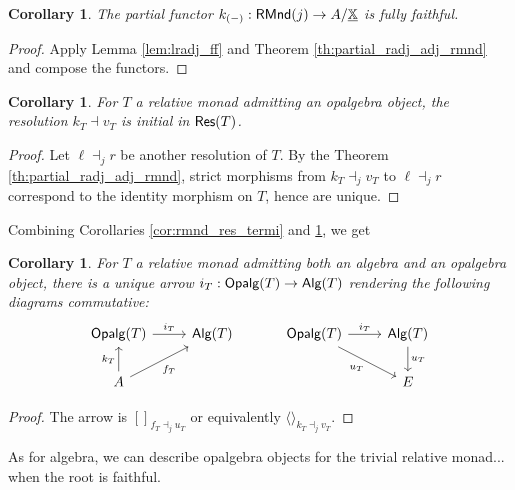 \documentclass[10pt,a4paper]{article}
\newcommand{\bb}[1]{\mathbb{#1}}
\newcommand{\cat}[1]{\textcat{#1}}
\newcommand{\textcat}[1]{{\normalfont\textsf{#1}}}
\newcommand{\tp}[1]{\langle#1\rangle}
\newcommand{\unit}{{\tp{}}}
\DeclareMathOperator{\Alg}{\cat{Alg}}
\DeclareMathOperator{\Opalg}{\cat{Opalg}}
\theoremstyle{plain}
\newtheorem{corollary}[theorem]{Corollary}
\theoremstyle{definition}
\theoremstyle{remark}
\begin{document}
\begin{corollary}
    The partial functor $k_{(-)} : \cat{RMnd}(j) \to A/\underline{\bb X}$ is fully faithful.
\end{corollary}

\begin{proof}
    Apply Lemma \ref{lem:lradj_ff} and Theorem \ref{th:partial_radj_adj_rmnd} and compose the functors.
\end{proof}

\begin{corollary}
    \label{cor:rmnd_res_init}
    For $T$ a relative monad admitting an opalgebra object, the resolution $k_T \dashv v_T$ is initial in $\cat{Res}(T)$.
\end{corollary}

\begin{proof}
    Let $\ell\dashv_jr$ be another resolution of $T$. By the Theorem \ref{th:partial_radj_adj_rmnd}, strict morphisms from $k_T\dashv_jv_T$ to $\ell\dashv_jr$ correspond to the identity morphism on $T$, hence are unique.
\end{proof}

Combining Corollaries \ref{cor:rmnd_res_termi} and \ref{cor:rmnd_res_init}, we get

\begin{corollary}
    For $T$ a relative monad admitting both an algebra and an opalgebra object, there is a unique arrow $i_T : \Opalg(T) \to \Alg(T)$ rendering the following diagrams commutative:
    \[\begin{tikzcd}
        {\Opalg(T)} \ar[r, "i_T"] & {\Alg(T)}\\
        A \ar[u, "k_T"] \ar[ur, "f_T"']
    \end{tikzcd}
    \hspace{3em}
    \begin{tikzcd}
        {\Opalg(T)} \ar[r, "i_T"] \ar[dr, "u_T"'] & {\Alg(T)} \ar[d, "u_T"]\\
                                                  & E
    \end{tikzcd}\]
\end{corollary}

\begin{proof}
    The arrow is $[]_{f_T\dashv_ju_T}$ or equivalently $\unit_{k_T\dashv_jv_T}$.
\end{proof}

As for algebra, we can describe opalgebra objects for the trivial relative monad... when the root is faithful.
\end{document}
